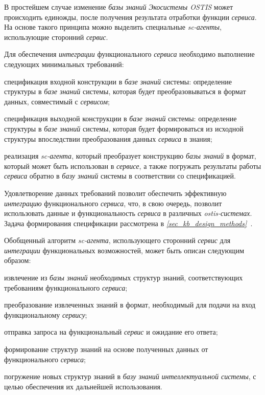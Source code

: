В простейшем случае изменение \textit{базы знаний} \textit{Экосистемы OSTIS} может происходить единожды, после получения результата отработки функции \textit{сервиса}. На основе такого принципа можно выделить специальные \textit{sc-агенты}, использующие сторонний \textit{сервис}. 

Для обеспечения \textit{интеграции} функционального \textit{сервиса} необходимо выполнение следующих минимальных требований:
\begin{textitemize}
    \item спецификация входной конструкции в \textit{базе знаний} системы: определение структуры в \textit{базе знаний} системы, которая будет преобразовываться в формат данных, совместимый с \textit{сервисом};
    \item спецификация выходной конструкции в \textit{базе знаний} системы: определение структуры в \textit{базе знаний} системы, которая будет формироваться из исходной структуры впоследствии преобразования данных \textit{сервиса} в знания;
    \item реализация \textit{sc-агента}, который преобразует конструкцию \textit{базы знаний} в формат, который может быть использован в \textit{сервисе}, а также погружать результаты работы \textit{сервиса} обратно в \textit{базу знаний} системы в соответствии со спецификацией.
\end{textitemize}

Удовлетворение данных требований позволит обеспечить эффективную \textit{интеграцию} функционального \textit{сервиса}, что, в свою очередь, позволит использовать данные и функциональность \textit{сервиса} в различных \textit{ostis-системах}. Задача формирования спецификации рассмотрена в \textit{\ref{sec_kb_design_methods}~}.

Обобщенный алгоритм \textit{sc-агента}, использующего сторонний \textit{сервис} для \textit{интеграции} функциональных возможностей, может быть описан следующим образом:

\begin{textitemize}
    \item извлечение из \textit{базы знаний} необходимых структур знаний, соответствующих требованиям функционального \textit{сервиса};
    \item преобразование извлеченных знаний в формат, необходимый для подачи на вход функциональному \textit{сервису};
    \item отправка запроса на функциональный \textit{сервис} и ожидание его ответа;
    \item формирование структур знаний на основе полученных данных от функционального \textit{сервиса};
    \item погружение новых структур знаний в \textit{базу знаний} \textit{интеллектуальной системы}, с целью обеспечения их дальнейшей использования.
\end{textitemize}

